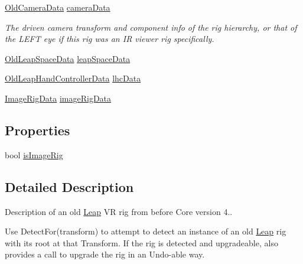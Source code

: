 \begin{DoxyCompactItemize}
\mbox{\hyperlink{class_leap_1_1_unity_1_1_old_rig_hierarchy_1_1_old_camera_data}{Old\+Camera\+Data}} \mbox{\hyperlink{class_leap_1_1_unity_1_1_old_rig_hierarchy_a1273b07cacb3db69876ad8bbf0eec077}{camera\+Data}}
\begin{DoxyCompactList}\small\item\em The driven camera transform and component info of the rig hierarchy, or that of the L\+E\+FT eye if this rig was an IR viewer rig specifically. \end{DoxyCompactList}\item 
\mbox{\hyperlink{class_leap_1_1_unity_1_1_old_rig_hierarchy_1_1_old_leap_space_data}{Old\+Leap\+Space\+Data}} \mbox{\hyperlink{class_leap_1_1_unity_1_1_old_rig_hierarchy_ac0517cc34c4970352fd9c8d0b8e903dd}{leap\+Space\+Data}}
\item 
\mbox{\hyperlink{class_leap_1_1_unity_1_1_old_rig_hierarchy_1_1_old_leap_hand_controller_data}{Old\+Leap\+Hand\+Controller\+Data}} \mbox{\hyperlink{class_leap_1_1_unity_1_1_old_rig_hierarchy_a741aa0070b5769cf8c3c2de3173bdcd9}{lhc\+Data}}
\item 
\mbox{\hyperlink{class_leap_1_1_unity_1_1_old_rig_hierarchy_1_1_image_rig_data}{Image\+Rig\+Data}} \mbox{\hyperlink{class_leap_1_1_unity_1_1_old_rig_hierarchy_aa3a77f111240bc39cc8dbad463be1be4}{image\+Rig\+Data}}
\end{DoxyCompactItemize}
\subsection*{Properties}
\begin{DoxyCompactItemize}
\item 
bool \mbox{\hyperlink{class_leap_1_1_unity_1_1_old_rig_hierarchy_aa6ff09cd65c3952f379e01467e97c14a}{is\+Image\+Rig}}
\end{DoxyCompactItemize}


\subsection{Detailed Description}
Description of an old \mbox{\hyperlink{namespace_leap_1_1_unity_1_1_leap}{Leap}} VR rig from before Core version 4.. 

Use Detect\+For(transform) to attempt to detect an instance of an old \mbox{\hyperlink{namespace_leap_1_1_unity_1_1_leap}{Leap}} rig with its root at that Transform. If the rig is detected and upgradeable, also provides a call to upgrade the rig in an Undo-\/able way. 


